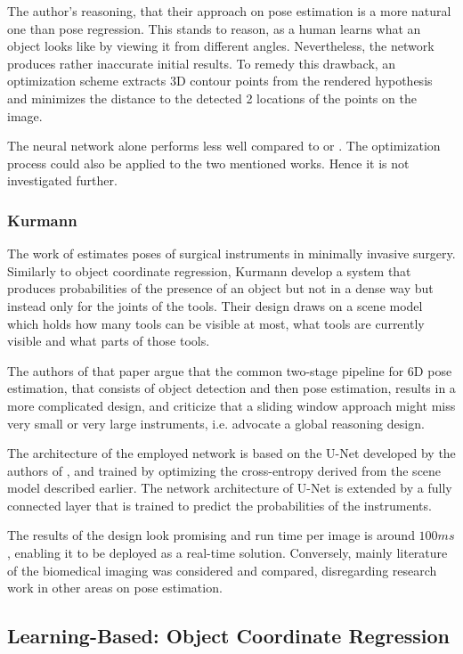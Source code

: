 The author's reasoning, that their approach on pose estimation is a more natural one than pose regression. This stands to reason, as a human learns what an object looks like by viewing it from different angles. Nevertheless, the network produces rather inaccurate initial results.  To remedy this drawback, an optimization scheme extracts 3D contour points from the rendered hypothesis and minimizes the distance to the detected 2 locations of the points on the image. 

The neural network alone performs less well compared to \cite{brachmann1} or \cite{bb8}. The optimization process could also be applied to the two mentioned works. Hence it is not investigated further. 

\subsubsection{Kurmann \etal}

The work of \cite{kurmann} estimates poses of surgical instruments in minimally invasive surgery. Similarly to object coordinate regression, Kurmann \etal develop a system that produces probabilities of the presence of an object but not in a dense way but instead only for the joints of the tools. Their design draws on a scene model which holds how many tools can be visible at most, what tools are currently visible and what parts of those tools.

The authors of that paper argue that the common two-stage pipeline for 6D pose estimation, that consists of object detection and then pose estimation, results in a more complicated design, and criticize that a sliding window approach might miss very small or very large instruments, i.e. advocate a global reasoning design.

The architecture of the employed network is based on the U-Net developed by the authors of \cite{oronneberger}, and trained by optimizing the cross-entropy derived from the scene model described earlier. The network architecture of U-Net is extended by a fully connected layer that is trained to predict the probabilities of the instruments.

The results of the design look promising and run time per image is around $100 ms$, enabling it to be deployed as a real-time solution. Conversely, mainly literature of the biomedical imaging was considered and compared, disregarding research work in other areas on pose estimation.

\subsection{Learning-Based: Object Coordinate Regression}

